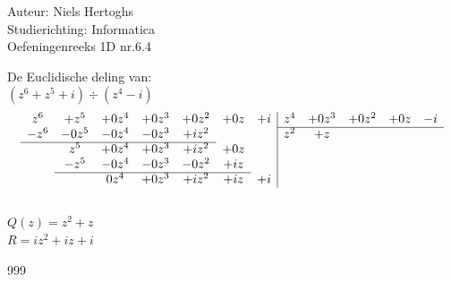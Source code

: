 \documentclass[a4paper]{article}
\begin{document}
  
\noindent \large Auteur: Niels Hertoghs			\\
\noindent \large Studierichting: Informatica\\
\noindent \large Oefeningenreeks 1D nr.6.4	\\

\medskip

\normalsize

De Euclidische deling van: \\

$(z^6 + z^5 + i) \div (z^4 - i)$\\


\[
\begin{array}{ccccccc|ccccc}
z^6 & +z^5 & +0z^4 & +0z^3 & +0z^2 & +0z & +i & z^4 & +0z^3 & +0z^2 & +0z & -i\\ \cline{8-12}
-z^6 & -0z^5 & -0z^4 & -0z^3 & +iz^2 &  &  & z^2 & +z &  &  & \\ \cline{1-5}
 & z^5 & +0z^4 & +0z^3 & +iz^2 & +0z &  &  &  &  &  & \\
 & -z^5 & -0z^4 & -0z^3 & -0z^2 & +iz &  &  &  &  &  & \\ \cline{2-6}
 &  & 0z^4 & +0z^3 & +iz^2 & +iz & +i &  &  &  &  & 
\end{array}
\] \\

$Q(z) = z^2+z$\\

$R = iz^2+iz+i $\\

\begin{thebibliography}{999}
\end{thebibliography}
\end{document}
